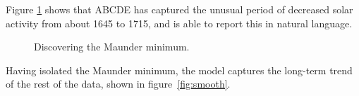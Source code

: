 \documentclass[letterpaper]{article}
\newcommand{\procedurename}{ABCDE}
\begin{document}
Figure \ref{fig:maunder} shows that \procedurename{} has captured the unusual period of decreased solar activity from about 1645 to 1715, and is able to report this in natural language.
%
\begin{figure}[ht]
\centering
{}
\caption{Discovering the Maunder minimum.}
\label{fig:maunder}
\end{figure}
%
%
Having isolated the Maunder minimum, the model captures the long-term trend of the rest of the data, shown in figure~\ref{fig:smooth}.
%
\end{document}
